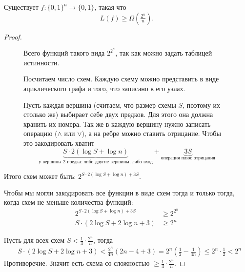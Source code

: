 \begin{thm}[Шеннон]\label{thm:hard}
	Существует $ f \colon \{0, 1\}^{n} \to  \{0, 1\}$, такая что 
	$$ L(f) \ge \Omega\left( \tfrac{2^{n}}{n} \right) .$$
\end{thm}
\begin{proof}
\begin{figure}[h]
	\begin{minipage}{0.7\textwidth}
    Всего функций такого вида $ 2^{2^{n}}$, так как можно задать таблицей истинности.

	Посчитаем число схем. Каждую схему можно представить в виде ациклического графа и того, что записано в его узлах.

	Пусть каждая вершина (считаем, что размер схемы $ S$, поэтому их столько же) выбирает себе двух предков. Для этого она должна хранить их номера. 
	Так же в каждую вершину нужно записать операцию ($ \land$ или $ \lor$), а на ребре можно ставить отрицание. Чтобы это закодировать хватит 
	$$
	\underbrace{S \cdot 2 ( \log S + \log n)}_{\text{у вершины 2 предка: либо другие вершины, либо вход}} + \underbrace{3S}_{\text{операция плюс отрицания}}
	$$
	\end{minipage}
	\begin{minipage}{0.27\textwidth}
		\centering
		\label{fig:scheme-hard}
	\end{minipage}
\end{figure}

	Итого схем может быть: $2^{ S \cdot 2 (\log S + \log n) + 3S}$.

	Чтобы мы могли закодировать все функции в виде схем тогда и только тогда, когда 
	схем не меньше  количества функций:
	\begin{align*}
		2^{S \cdot  2( \log S + \log n) + 3S} &\ge  2^{2^n} \\
		S \cdot  ( 2\log S + 2\log n + 3)&\ge  2^n 
	\end{align*}
	
	Пусть для всех схем $S < \frac{1}{4}\cdot\frac{2^n}{n}$, тогда 
	\begin{align*}
	    &S\cdot(2\log S + 2 \log n + 3) < \frac{2^n}{4n}(2n - 4 + 3) = 2^n\left(\frac{1}{2} - \frac{1}{4n}\right) \le 2^n \cdot \frac{1}{2} < 2^n
	\end{align*}
	Противоречие. Значит есть схема со сложностью $\ge \frac{1}{4}\cdot\frac{2^n}{n}$.
	
\end{proof}

